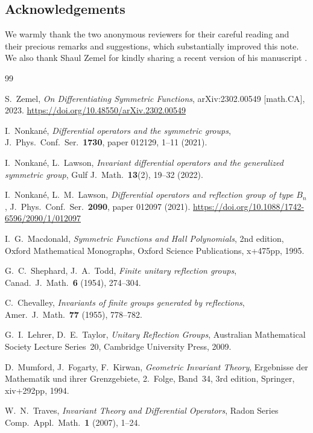 \documentclass[11pt]{article}
\theoremstyle{remark}
\begin{document}
\subsection*{Acknowledgements}

We warmly thank the two anonymous reviewers for their careful reading and their precious remarks and suggestions, which substantially improved this note. We also thank Shaul Zemel for kindly sharing a recent version of his manuscript \cite{Ze}.

\begin{thebibliography}{99}

 S.\ Zemel, \emph{On Differentiating Symmetric Functions}, arXiv:2302.00549 [math.CA], 2023. \url{https://doi.org/10.48550/arXiv.2302.00549}

 I.\ Nonkané, \emph{Differential operators and the symmetric groups}, J.\ Phys.\ Conf.\ Ser.\ \textbf{1730}, paper 012129, 1--11 (2021).

 I.\ Nonkané, L.\ Lawson, \emph{Invariant differential operators and the generalized symmetric group}, Gulf J.\ Math.\ \textbf{13}(2), 19--32 (2022).

 I.\ Nonkané, L.\ M.\ Lawson, \emph{Differential operators and reflection group of type $B_n$}, J.\ Phys.\ Conf.\ Ser.\ \textbf{2090}, paper 012097 (2021). \url{https://doi.org/10.1088/1742-6596/2090/1/012097}

 I.\ G.\ Macdonald, \emph{Symmetric Functions and Hall Polynomials}, 2nd edition, Oxford Mathematical Monographs, Oxford Science Publications, x+475pp, 1995.

 G.\ C.\ Shephard, J.\ A.\ Todd, \emph{Finite unitary reflection groups}, Canad.\ J.\ Math.\ \textbf{6} (1954), 274--304.

 C.\ Chevalley, \emph{Invariants of finite groups generated by reflections}, Amer.\ J.\ Math.\ \textbf{77} (1955), 778--782.

 G.\ I.\ Lehrer, D.\ E.\ Taylor, \emph{Unitary Reflection Groups}, Australian Mathematical Society Lecture Series~20, Cambridge University Press, 2009.

 D.\ Mumford, J.\ Fogarty, F.\ Kirwan, \emph{Geometric Invariant Theory}, Ergebnisse der Mathematik und ihrer Grenzgebiete, 2.\ Folge, Band~34, 3rd edition, Springer, xiv+292pp, 1994.

 W.\ N.\ Traves, \emph{Invariant Theory and Differential Operators}, Radon Series Comp.\ Appl.\ Math.\ \textbf{1} (2007), 1--24.


\end{thebibliography}
\end{document}
